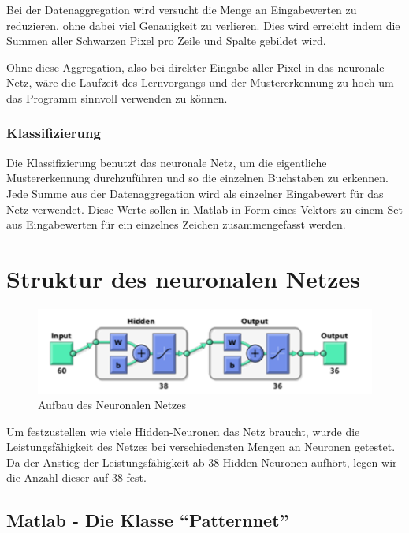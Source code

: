 Bei der Datenaggregation wird versucht die Menge an Eingabewerten zu reduzieren,
ohne dabei viel Genauigkeit zu verlieren. Dies wird erreicht indem 
die Summen aller Schwarzen Pixel pro Zeile und Spalte gebildet wird. 

Ohne diese Aggregation, also bei direkter Eingabe aller Pixel in das
neuronale Netz, wäre die Laufzeit des Lernvorgangs und der Mustererkennung zu
hoch um das Programm sinnvoll verwenden zu können.
\subsubsection{Klassifizierung}

Die Klassifizierung benutzt das neuronale Netz, um die eigentliche
Mustererkennung durchzuführen und so die einzelnen Buchstaben zu
erkennen. Jede Summe aus der Datenaggregation wird als einzelner Eingabewert
für das Netz verwendet. Diese Werte sollen in Matlab in Form eines Vektors zu
einem Set aus Eingabewerten für ein einzelnes Zeichen zusammengefasst werden.

\section{Struktur des neuronalen Netzes}

\begin{figure}
  \begin{center}
    \includegraphics[width=12cm]{res/PatternNet-Aufbau.png}
  \end{center}
  \vspace{-5pt}
  \caption{Aufbau des Neuronalen Netzes}
  \vspace{-10pt}


\end{figure}
Um festzustellen wie viele Hidden-Neuronen das Netz braucht, wurde die Leistungsfähigkeit des Netzes bei verschiedensten Mengen an Neuronen getestet. Da der Anstieg der Leistungsfähigkeit ab $38$ Hidden-Neuronen aufhört, legen wir die Anzahl dieser auf $38$ fest.

\subsection{Matlab - Die Klasse ``Patternnet''}

